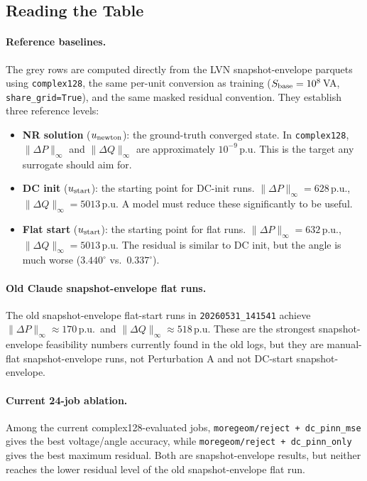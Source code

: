 \documentclass{article}
\begin{document}
\subsection{Reading the Table}

\paragraph{Reference baselines.}
The grey rows are computed directly from the LVN snapshot-envelope parquets
using \texttt{complex128}, the same per-unit conversion as training
($S_{\rm base}=10^8$\,VA, \texttt{share\_grid=True}), and the same masked
residual convention.  They establish three reference levels:

\begin{itemize}[noitemsep]
  \item \textbf{NR solution} ($u_{\rm newton}$): the ground-truth converged
    state. In \texttt{complex128}, $\|\Delta P\|_\infty$ and
    $\|\Delta Q\|_\infty$ are approximately $10^{-9}$\,p.u.  This is the
    target any surrogate should aim for.
  \item \textbf{DC init} ($u_{\rm start}$): the starting point for DC-init
    runs. $\|\Delta P\|_\infty = 628$\,p.u.,
    $\|\Delta Q\|_\infty = 5013$\,p.u.  A model must reduce these
    significantly to be useful.
  \item \textbf{Flat start} ($u_{\rm start}$): the starting point for flat
    runs. $\|\Delta P\|_\infty = 632$\,p.u., $\|\Delta Q\|_\infty = 5013$\,p.u.
    The residual is similar to DC init, but the angle is much worse
    ($3.440^\circ$ vs.\ $0.337^\circ$).
\end{itemize}

\paragraph{Old Claude snapshot-envelope flat runs.}
The old snapshot-envelope flat-start runs in \texttt{20260531\_141541}
achieve $\|\Delta P\|_\infty \approx 170$\,p.u.\ and
$\|\Delta Q\|_\infty \approx 518$\,p.u.  These are the strongest
snapshot-envelope feasibility numbers currently found in the old logs, but
they are manual-flat snapshot-envelope runs, not Perturbation A and not
DC-start snapshot-envelope.

\paragraph{Current 24-job ablation.}
Among the current complex128-evaluated jobs,
\texttt{moregeom/reject + dc\_pinn\_mse} gives the best voltage/angle
accuracy, while \texttt{moregeom/reject + dc\_pinn\_only} gives the best
maximum residual.  Both are snapshot-envelope results, but neither reaches
the lower residual level of the old snapshot-envelope flat run.
\end{document}
